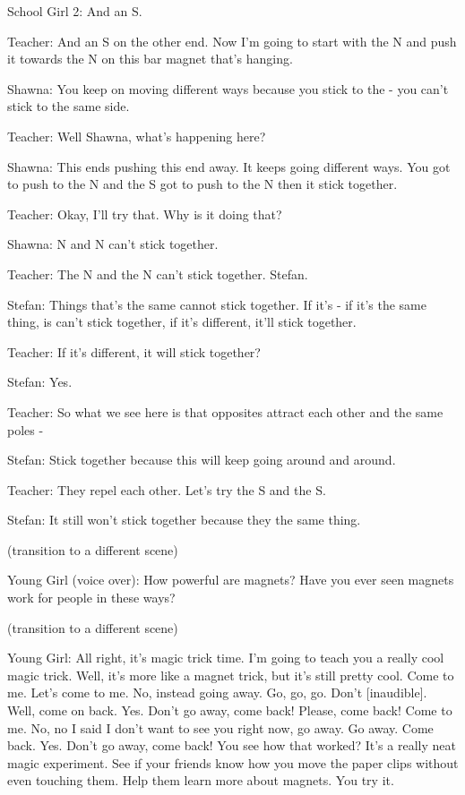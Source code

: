 School Girl 2: And an S.

Teacher: And an S on the other end. Now I'm going to start with the N and push it towards the N on this bar magnet that's hanging.

Shawna: You keep on moving different ways because you stick to the - you can't stick to the same side.

Teacher: Well Shawna, what's happening here?

Shawna: This ends pushing this end away. It keeps going different ways. You got to push to the N and the S got to push to the N then it stick together.

Teacher: Okay, I'll try that. Why is it doing that?

Shawna: N and N can't stick together.

Teacher: The N and the N can't stick together. Stefan.

Stefan: Things that's the same cannot stick together. If it's - if it's the same thing, is can't stick together, if it's different, it'll stick together.

Teacher: If it's different, it will stick together?

Stefan: Yes.

Teacher: So what we see here is that opposites attract each other and the same poles -

Stefan: Stick together because this will keep going around and around.

Teacher: They repel each other. Let's try the S and the S.

Stefan: It still won't stick together because they the same thing.

(transition to a different scene)

Young Girl (voice over): How powerful are magnets? Have you ever seen magnets work for people in these ways?

(transition to a different scene)

Young Girl: All right, it's magic trick time. I'm going to teach you a really cool magic trick. Well, it's more like a magnet trick, but it's still pretty cool. Come to me. Let's come to me. No, instead going away. Go, go, go. Don't [inaudible]. Well, come on back. Yes. Don't go away, come back! Please, come back! Come to me. No, no I said I don't want to see you right now, go away. Go away. Come back. Yes. Don't go away, come back! You see how that worked? It's a really neat magic experiment. See if your friends know how you move the paper clips without even touching them. Help them learn more about magnets. You try it.

